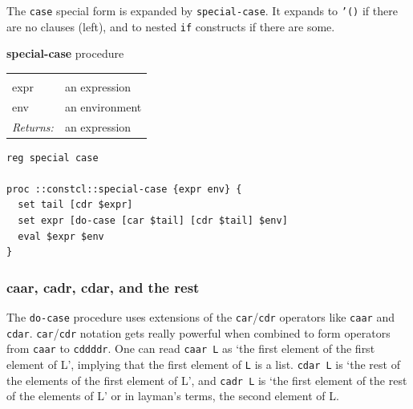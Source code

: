 \documentclass[twoside,9pt]{report}
\begin{document}
The \texttt{case} special form is expanded by \texttt{special-case}. It expands to \texttt{'()} if there are no clauses (left), and to nested \texttt{if} constructs if there are some.



\textbf{special-case} procedure

\noindent\begin{tabular}{ |p{1.9cm} p{8cm}| }
\hline
\rowcolor[HTML]{CCCCCC} \multicolumn{2}{|l|}{\bf special-case (internal)} \\
expr & an expression \\
env & an environment \\
\textit{Returns:} & an expression \\
\hline
\end{tabular}
\begin{lstlisting}
reg special case

proc ::constcl::special-case {expr env} {
  set tail [cdr $expr]
  set expr [do-case [car $tail] [cdr $tail] $env]
  eval $expr $env
}
\end{lstlisting}

\begin{pulledtext}
\subsubsection{caar, cadr, cdar, and the rest}
\label{caar,-cadr,-cdar,-and-the-rest}


The \texttt{do-case} procedure uses extensions of the \texttt{car}/\texttt{cdr} operators like \texttt{caar} and \texttt{cdar}. \texttt{car}/\texttt{cdr} notation gets really powerful when combined to form operators from \texttt{caar} to \texttt{cddddr}. One can read \texttt{caar L} as `the first element of the first element of L', implying that the first element of \texttt{L} is a list. \texttt{cdar L} is `the rest of the elements of the first element of L', and \texttt{cadr L} is `the first element of the rest of the elements of L' or in layman's terms, the second element of L.

\end{pulledtext}
\end{document}
